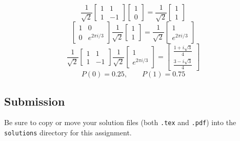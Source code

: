 \documentclass{article}
\begin{document}
\[\frac1{\sqrt2}\begin{bmatrix}1&1\\1&-1\end{bmatrix}\begin{bmatrix}1\\0\end{bmatrix}=\frac1{\sqrt2}\begin{bmatrix}1\\1\end{bmatrix}\]
\[\begin{bmatrix}1&0\\0&e^{2\pi i/3}\end{bmatrix}\frac1{\sqrt2}\begin{bmatrix}1\\1\end{bmatrix}=\frac1{\sqrt2}\begin{bmatrix}1\\e^{2\pi i/3}\end{bmatrix}\]
\[\frac1{\sqrt2}\begin{bmatrix}1&1\\1&-1\end{bmatrix}\frac1{\sqrt2}\begin{bmatrix}1\\e^{2\pi i/3}\end{bmatrix}=\begin{bmatrix}\frac{1+i\sqrt3}{4}\\\frac{3-i\sqrt3}{4}\end{bmatrix}\]
\[P(0)=0.25,\qquad P(1)=0.75\]

\subsection*{Submission}

Be sure to copy or move your solution files (both \texttt{.tex} and \texttt{.pdf}) into the \texttt{solutions} directory for this assignment.
\end{document}
